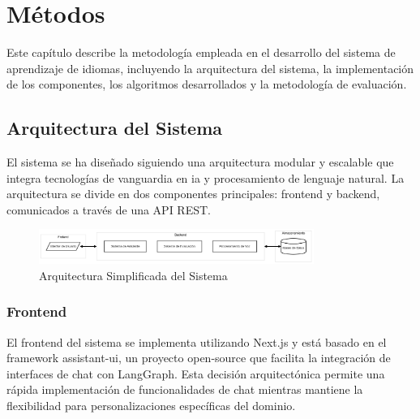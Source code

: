 \chapter{Métodos}
\label{metodos}

Este capítulo describe la metodología empleada en el desarrollo del sistema de aprendizaje de idiomas, incluyendo la arquitectura del sistema, la implementación de los componentes, los algoritmos desarrollados y la metodología de evaluación.

\section{Arquitectura del Sistema}
\label{arquitectura-sistema}

El sistema se ha diseñado siguiendo una arquitectura modular y escalable que integra tecnologías de vanguardia en \gls{ia} y procesamiento de lenguaje natural. La arquitectura se divide en dos componentes principales: frontend y backend, comunicados a través de una API REST.

\begin{figure}[H]
	\centering
	\includegraphics[width=0.8\textwidth]{figuras/system-overview.png}
	\caption{Arquitectura Simplificada del Sistema}
	\label{fig:arquitectura-sistema}
\end{figure}


\subsection{Frontend}
\label{frontend}

El frontend del sistema se implementa utilizando Next.js y está basado en el framework \gls{assistant-ui}, un proyecto \gls{open-source} que facilita la integración de interfaces de chat con LangGraph. Esta decisión arquitectónica permite una rápida implementación de funcionalidades de chat mientras mantiene la flexibilidad para personalizaciones específicas del dominio.

